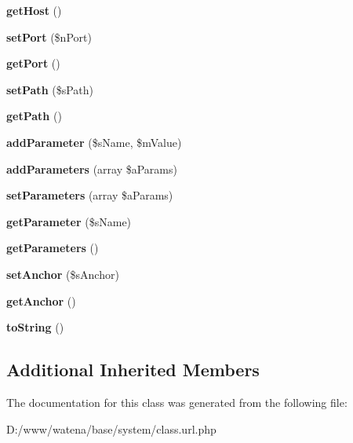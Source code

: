 \begin{DoxyCompactItemize}
\item 
\hypertarget{class_url_aedbab934f1b9399186396338a39e5517}{{\bfseries get\-Host} ()}\label{class_url_aedbab934f1b9399186396338a39e5517}

\item 
\hypertarget{class_url_a6ecf691e856f66c2727db77db79b009a}{{\bfseries set\-Port} (\$n\-Port)}\label{class_url_a6ecf691e856f66c2727db77db79b009a}

\item 
\hypertarget{class_url_a59855c0c38e48fa781af912d531ac8af}{{\bfseries get\-Port} ()}\label{class_url_a59855c0c38e48fa781af912d531ac8af}

\item 
\hypertarget{class_url_a97a3514571ced408a2e84c6027b657da}{{\bfseries set\-Path} (\$s\-Path)}\label{class_url_a97a3514571ced408a2e84c6027b657da}

\item 
\hypertarget{class_url_aa9436e8bd3c5e7436d35dfd00b694b91}{{\bfseries get\-Path} ()}\label{class_url_aa9436e8bd3c5e7436d35dfd00b694b91}

\item 
\hypertarget{class_url_a94f8108da4d4e500440bbf56a8b0418e}{{\bfseries add\-Parameter} (\$s\-Name, \$m\-Value)}\label{class_url_a94f8108da4d4e500440bbf56a8b0418e}

\item 
\hypertarget{class_url_ab552842f77ab2fc6849c261275b3825b}{{\bfseries add\-Parameters} (array \$a\-Params)}\label{class_url_ab552842f77ab2fc6849c261275b3825b}

\item 
\hypertarget{class_url_a35edb99ad9806eaee760a46b75af8397}{{\bfseries set\-Parameters} (array \$a\-Params)}\label{class_url_a35edb99ad9806eaee760a46b75af8397}

\item 
\hypertarget{class_url_a4edec47332ae26567b9958b9c25c0039}{{\bfseries get\-Parameter} (\$s\-Name)}\label{class_url_a4edec47332ae26567b9958b9c25c0039}

\item 
\hypertarget{class_url_a337ddb608144bec74af566b255a4dfda}{{\bfseries get\-Parameters} ()}\label{class_url_a337ddb608144bec74af566b255a4dfda}

\item 
\hypertarget{class_url_a0326ba11811773094c16055873c5a507}{{\bfseries set\-Anchor} (\$s\-Anchor)}\label{class_url_a0326ba11811773094c16055873c5a507}

\item 
\hypertarget{class_url_ab08ccf719cef0129d38665887dfee288}{{\bfseries get\-Anchor} ()}\label{class_url_ab08ccf719cef0129d38665887dfee288}

\item 
\hypertarget{class_url_a54e84f98d7e6f999e971f17c1b1f2cc0}{{\bfseries to\-String} ()}\label{class_url_a54e84f98d7e6f999e971f17c1b1f2cc0}

\end{DoxyCompactItemize}
\subsection*{Additional Inherited Members}


The documentation for this class was generated from the following file\-:\begin{DoxyCompactItemize}
\item 
D\-:/www/watena/base/system/class.\-url.\-php\end{DoxyCompactItemize}

